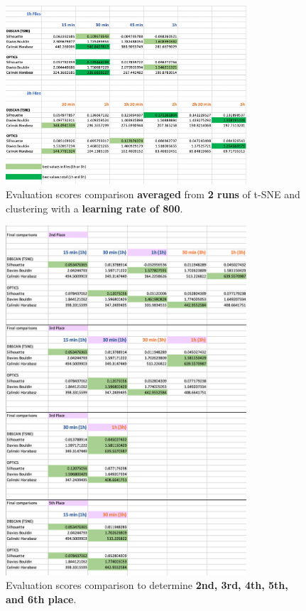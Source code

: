 \begin{figure}[H]
  \centering
  \includegraphics[width=0.8\textwidth]{./images/clusteringResults/clusteringResults5.png}
  \caption{Evaluation scores comparison \textbf{averaged} from \textbf{2 runs} of t-SNE and clustering with a \textbf{learning rate of 800}.}
  \label{figure:clusteringResults5}
\end{figure}

\begin{figure}[H]
  \centering
  \includegraphics[width=0.8\textwidth]{./images/clusteringResults/clusteringResultsPlaces.png}
  \caption{Evaluation scores comparison to determine \textbf{2nd, 3rd, 4th, 5th, and 6th place}.}
  \label{figure:clusterResultsPlaces}
\end{figure}


\clearpage